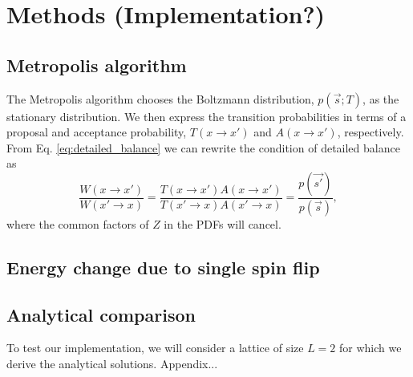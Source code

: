 \section{Methods (Implementation?)}\label{sec:methods}

\subsection{Metropolis algorithm}\label{subsec_methods:metropolis}

The Metropolis algorithm chooses the Boltzmann distribution, $p(\vec{s};T)$, as the stationary distribution. We then express the transition probabilities in terms of a proposal and acceptance probability, $T(x\to x')$ and $A(x\to x')$, respectively. From Eq. \eqref{eq:detailed_balance} we can rewrite the condition of detailed balance as 
\begin{equation}
    \frac{W(x\to x')}{W(x'\to x)} = \frac{T(x\to x') A(x\to x')}{T(x' \to x) A(x'\to x)} = \frac{p(\vec{s'})}{p(\vec{s})},
\end{equation}  
where the common factors of $Z$ in the PDFs will cancel. 

\subsection{Energy change due to single spin flip}\label{subsec_methods:de_from_single_flip}


\subsection{Analytical comparison}\label{subsec_methods:analytical_test}
To test our implementation, we will consider a lattice of size $L=2$ for which we derive the analytical solutions. Appendix...  

